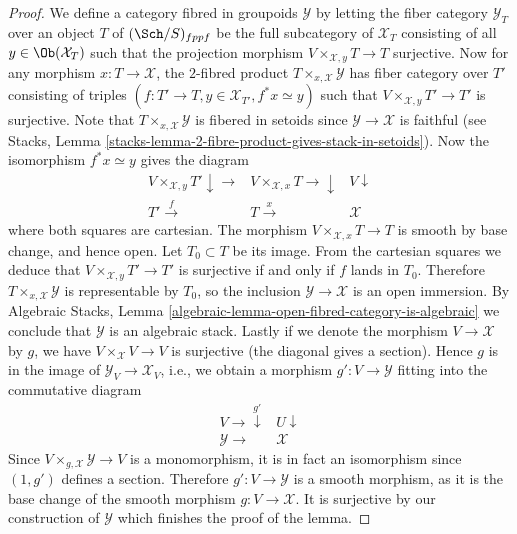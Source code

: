\begin{proof}
We define a category fibred in groupoids $\mathcal Y$ by letting the fiber
category $\mathcal{Y}_T$ over an object $T$ of $(\Sch/S)_{fppf}$ be
the full subcategory of $\mathcal{X}_T$ consisting of all
$y \in \Ob(\mathcal{X}_T)$ such that the projection morphism
$V \times_{\mathcal X, y} T \to T$ surjective. Now for any morphism
$x : T \to \mathcal X$, the $2$-fibred product
$T \times_{x, \mathcal X} \mathcal Y$ has fiber category over $T'$ consisting
of triples $(f : T' \to T, y \in \mathcal{X}_{T'}, f^*x \simeq y)$ such that
$V \times_{\mathcal X, y} T' \to T'$ is surjective.
Note that $T \times_{x, \mathcal X} \mathcal Y$ is fibered in setoids since
$\mathcal Y \to \mathcal X$ is faithful (see
Stacks, Lemma \ref{stacks-lemma-2-fibre-product-gives-stack-in-setoids}).
Now the isomorphism $f^*x \simeq y$ gives the diagram
$$
\begin{array}{ccc}V \times_{\mathcal X, y} T' \downarrow\longrightarrow & V \times_{\mathcal X, x} T \longrightarrow\downarrow & V \downarrow \\ T' \overset{f}{\longrightarrow} & T \overset{x}{\longrightarrow} & \mathcal X\end{array}
$$
where both squares are cartesian. The morphism
$V \times_{\mathcal X, x} T \to T$ is smooth by base change, and hence open.
Let $T_0 \subset T$ be its image. From the cartesian squares we deduce that
$V \times_{\mathcal X, y} T' \to T'$ is surjective if and only if $f$ lands
in $T_0$.  Therefore $T \times_{x, \mathcal X} \mathcal Y$ is representable by
$T_0$, so the inclusion $\mathcal Y \to \mathcal X$ is an open immersion.
By
Algebraic Stacks, Lemma \ref{algebraic-lemma-open-fibred-category-is-algebraic}
we conclude that $\mathcal{Y}$ is an algebraic stack.
Lastly if we denote the morphism $V \to \mathcal X$ by $g$, we have
$V \times_{\mathcal X} V \to V$ is surjective (the diagonal gives a
section). Hence $g$ is in the image of $\mathcal{Y}_V \to \mathcal{X}_V$, i.e.,
we obtain a morphism $g' : V \to \mathcal{Y}$ fitting into the commutative
diagram
$$
\begin{array}{cc}V \longrightarrow\overset{g'}{\downarrow} & U \downarrow \\ \mathcal{Y} \longrightarrow & \mathcal{X}\end{array}
$$
Since $V \times_{g, \mathcal X} \mathcal Y \to V$ is a
monomorphism, it is in fact an isomorphism since $(1, g')$ defines a section.
Therefore $g' : V \to \mathcal Y$ is a smooth morphism, as it is the
base change of the smooth morphism $g : V \to \mathcal{X}$.
It is surjective by our construction of $\mathcal{Y}$ which finishes
the proof of the lemma.
\end{proof}

